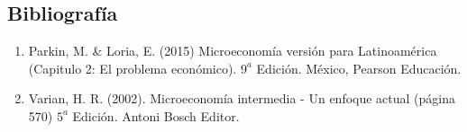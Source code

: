 \documentclass[a4paper,12pt]{report}
\begin{document}
\newpage

\subsection*{Bibliografía}

\begin{enumerate}

	\item Parkin, M. \& Loria, E. (2015) Microeconomía versión para Latinoamérica (Capitulo 2: El problema económico). $9^a$ Edición. México, Pearson Educación.

	\item Varian, H. R. (2002). Microeconomía intermedia - Un enfoque actual (página 570) $5^a$ Edición. Antoni Bosch Editor.


\end{enumerate}
\end{document}
